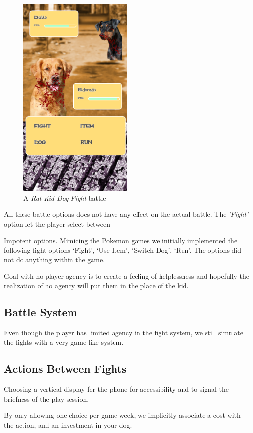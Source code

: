 \begin{figure}[h!]
	\centering
    \includegraphics[width=0.5\textwidth]{battle.png}
    \caption{A \textit{Rat Kid Dog Fight} battle}
    \label{fig:DogFightBattle}
\end{figure}

All these battle options does not have any effect on the actual battle. The \textit{'Fight'} option let the player select between 

Impotent options. Mimicing the Pokemon games we initially implemented the following fight options ‘Fight’, ‘Use Item’, ‘Switch Dog’, ‘Run’. The options did not do anything within the game.

Goal with no player agency is to create a feeling of helplessness and hopefully the realization of no agency will put them in the place of the kid. 

\subsection{Battle System}
Even though the player has limited agency in the fight system, we still simulate the fights with a very game-like system.





\subsection{Actions Between Fights}
Choosing a vertical display for the phone for accessibility and to signal the briefness of the play session.

By only allowing one choice per game week, we implicitly associate a cost with the action, and an investment in your dog.
